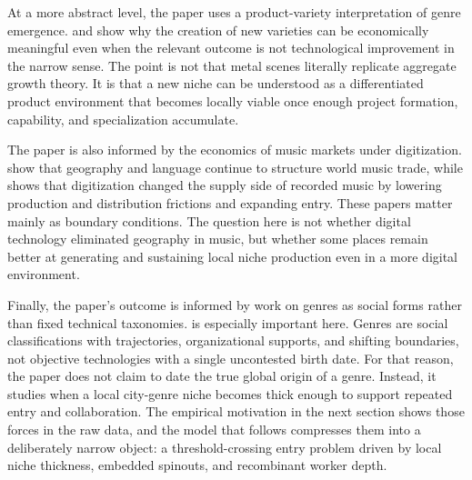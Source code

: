 At a more abstract level, the paper uses a product-variety interpretation of genre emergence.
\citet{dixit_stiglitz_1977} and \citet{romer_1990} show why the creation of new varieties can be
economically meaningful even when the relevant outcome is not technological improvement in the
narrow sense. The point is not that metal scenes literally replicate aggregate growth theory. It is
that a new niche can be understood as a differentiated product environment that becomes locally
viable once enough project formation, capability, and specialization accumulate.

The paper is also informed by the economics of music markets under digitization.
\citet{ferreira_waldfogel_2013} show that geography and language continue to structure world music
trade, while \citet{waldfogel_2015} shows that digitization changed the supply side of recorded
music by lowering production and distribution frictions and expanding entry. These papers matter
mainly as boundary conditions. The question here is not whether digital technology eliminated
geography in music, but whether some places remain better at generating and sustaining local niche
production even in a more digital environment.

Finally, the paper's outcome is informed by work on genres as social forms rather than fixed
technical taxonomies. \citet{lena_peterson_2008} is especially important here. Genres are social
classifications with trajectories, organizational supports, and shifting boundaries, not objective
technologies with a single uncontested birth date. For that reason, the paper does not claim to
date the true global origin of a genre. Instead, it studies when a local city-genre niche becomes
thick enough to support repeated entry and collaboration. The empirical motivation in the next
section shows those forces in the raw data, and the model that follows compresses them into a
deliberately narrow object: a threshold-crossing entry problem driven by local niche thickness,
embedded spinouts, and recombinant worker depth.

